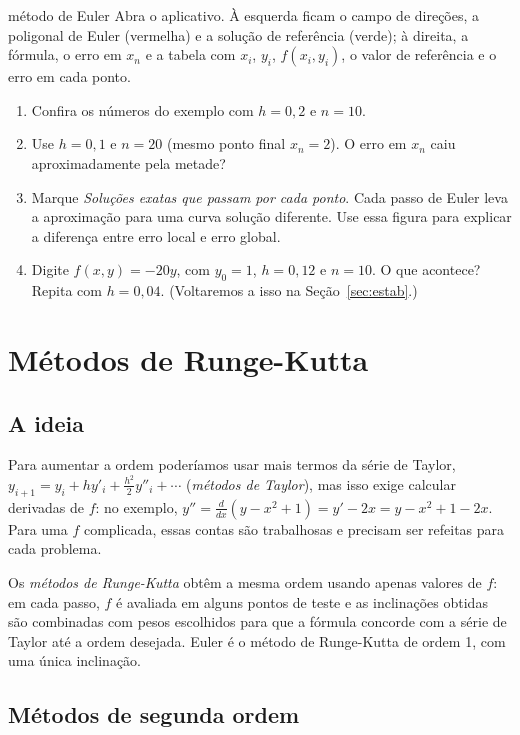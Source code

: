 \begin{atividade}{método de Euler}{\arqEuler}
Abra o aplicativo. À esquerda ficam o campo de direções, a poligonal de Euler (vermelha) e a
solução de referência (verde); à direita, a fórmula, o erro em $x_n$ e a tabela com $x_i$,
$y_i$, $f(x_i,y_i)$, o valor de referência e o erro em cada ponto.
\begin{enumerate}[nosep]
  \item Confira os números do exemplo com $h=0{,}2$ e $n=10$.
  \item Use $h=0{,}1$ e $n=20$ (mesmo ponto final $x_n=2$). O erro em $x_n$ caiu
        aproximadamente pela metade?
  \item Marque \emph{Soluções exatas que passam por cada ponto}. Cada passo de Euler leva a
        aproximação para uma curva solução diferente. Use essa figura para explicar a
        diferença entre erro local e erro global.
  \item Digite $f(x,y)=-20y$, com $y_0=1$, $h=0{,}12$ e $n=10$. O que acontece? Repita com
        $h=0{,}04$. (Voltaremos a isso na Seção~\ref{sec:estab}.)
\end{enumerate}
\end{atividade}

\section{Métodos de Runge-Kutta}

\subsection{A ideia}

Para aumentar a ordem poderíamos usar mais termos da série de Taylor,
$y_{i+1}=y_i+hy'_i+\frac{h^2}{2}y''_i+\cdots$ (\emph{métodos de Taylor}), mas isso exige
calcular derivadas de $f$: no exemplo, $y''=\frac{d}{dx}(y-x^2+1)=y'-2x=y-x^2+1-2x$. Para
uma $f$ complicada, essas contas são trabalhosas e precisam ser refeitas para cada problema.

Os \emph{métodos de Runge-Kutta} obtêm a mesma ordem usando apenas valores de $f$: em cada
passo, $f$ é avaliada em alguns pontos de teste e as inclinações obtidas são combinadas com
pesos escolhidos para que a fórmula concorde com a série de Taylor até a ordem desejada.
Euler é o método de Runge-Kutta de ordem 1, com uma única inclinação.

\subsection{Métodos de segunda ordem}


